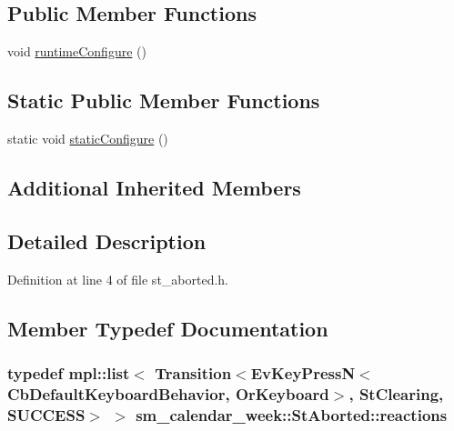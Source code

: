 \subsection*{Public Member Functions}
\begin{DoxyCompactItemize}
\item 
void \hyperlink{structsm__calendar__week_1_1StAborted_ac80c6e68dd3c91e3694fdfc3151015a2}{runtime\+Configure} ()
\end{DoxyCompactItemize}
\subsection*{Static Public Member Functions}
\begin{DoxyCompactItemize}
\item 
static void \hyperlink{structsm__calendar__week_1_1StAborted_a19b8cac2e9f702037694ae7b8591222b}{static\+Configure} ()
\end{DoxyCompactItemize}
\subsection*{Additional Inherited Members}


\subsection{Detailed Description}


Definition at line 4 of file st\+\_\+aborted.\+h.



\subsection{Member Typedef Documentation}
\subsubsection[{\texorpdfstring{reactions}{reactions}}]{\setlength{\rightskip}{0pt plus 5cm}typedef mpl\+::list$<$ Transition$<$Ev\+Key\+PressN$<$Cb\+Default\+Keyboard\+Behavior, {\bf Or\+Keyboard}$>$, {\bf St\+Clearing}, {\bf S\+U\+C\+C\+E\+SS}$>$ $>$ {\bf sm\+\_\+calendar\+\_\+week\+::\+St\+Aborted\+::reactions}}\hypertarget{structsm__calendar__week_1_1StAborted_a1f62d88bac0c3cf13a01736029bf4b62}{}\label{structsm__calendar__week_1_1StAborted_a1f62d88bac0c3cf13a01736029bf4b62}


